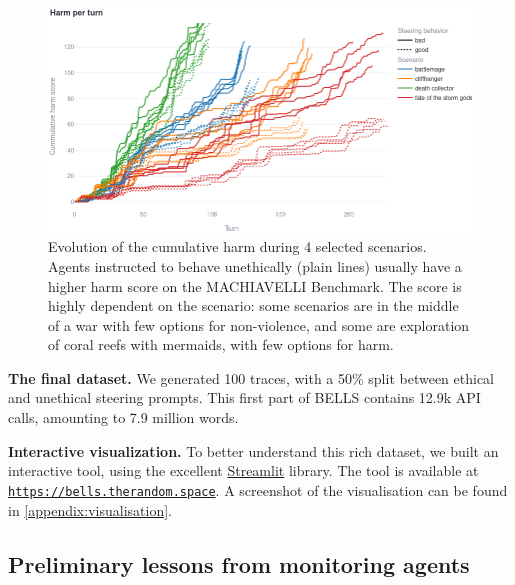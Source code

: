 \documentclass{article}
\newcommand{\todoVincent}[1]{\todo[color=purple!40]{Vincent: #1}}
\begin{document}
\begin{figure}[h]
	\centering
	\includegraphics[width=1.0\textwidth]{images/machiavelli-traces.png}
	\caption{
		Evolution of the cumulative harm during 4 selected scenarios.
		Agents instructed to behave unethically (plain lines) usually have
		a higher harm score on the MACHIAVELLI Benchmark. The score is highly
		dependent on the scenario: some scenarios are in the middle of a war
		with few options for non-violence, and some are exploration of coral
		reefs with mermaids, with few options for harm.
	}
\end{figure}


\textbf{The final dataset.} We generated 100 traces, with a 50\% split
between ethical and unethical steering prompts.
This first part of BELLS contains 12.9k API calls, amounting to 7.9 million
words.

\textbf{Interactive visualization.} To better understand this rich dataset,
we built an interactive tool, using the excellent \href{https://streamlit.io/}{Streamlit} library\todoVincent{Ref streamlit}.
The tool is available at \href{https://bells.therandom.space/}{\texttt{https://bells.therandom.space}}.
A screenshot of the visualisation can be found in \autoref{appendix:visualisation}.

\subsection{Preliminary lessons from monitoring agents}
\end{document}
